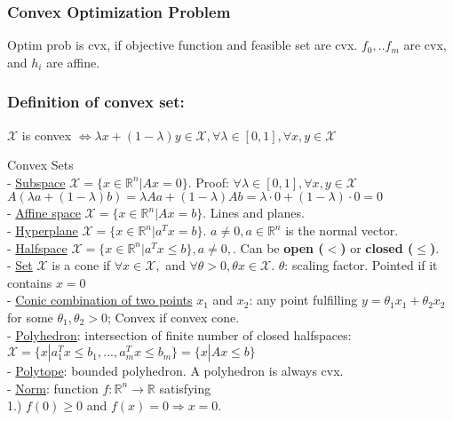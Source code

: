 \documentclass[10pt,parskip]{scrartcl}
\begin{document}
\begin{multicols*}{3}
\subsubsection{Convex Optimization Problem}
Optim prob is cvx, if objective function and feasible set are cvx. $f_0, ..f_m$ are cvx, and $h_i$ are affine.
 
\subsubsection{Definition of convex set:}
$\mathcal X$ is convex $\Leftrightarrow \lambda x + (1-\lambda) y \in \mathcal X, \forall \lambda \in [0,1], \forall x,y \in \mathcal X$


Convex Sets\\
- \underline{Subspace} $\mathcal X = \{ x \in \mathbb R^n | Ax = 0\}$. Proof: $ \forall \lambda \in [0,1], \forall x,y \in \mathcal X$ \\
 $ A(\lambda a + (1-\lambda) b) = \lambda A a + (1-\lambda)Ab = \lambda \cdot 0 + (1-\lambda) \cdot 0 = 0 $\\
- \underline{Affine space} $\mathcal X = \{ x \in \mathbb R^n | Ax = b\}$. Lines and planes.\\
- \underline{Hyperplane} $\mathcal X = \{ x \in \mathbb R^n | a^T x = b\}$. $ a \ne 0, a\in \mathbb R^n$ is the normal vector.\\
- \underline{Halfspace} $\mathcal X = \{ x \in \mathbb R^n | a^T x \leq b\}, a \ne 0,$. Can be \textbf{open ($<$)} or \textbf{closed ($\leq$)}.\\
- \underline{Set} $\mathcal X$ is a cone if $\forall x \in \mathcal X,$ and $\forall \theta > 0, \theta x \in \mathcal X$. $\theta$: scaling factor. Pointed if it contains $x=0$\\
- \underline{Conic combination of two points} $x_1$ and $x_2$: any point fulfilling $y = \theta_1 x_1 + \theta_2 x_2$\\
 for some $\theta_1, \theta_2 >0$; Convex if convex cone.\\
- \underline{Polyhedron}: intersection of finite number of closed halfspaces: $\mathcal X = \{x | a_1^T x \leq b_1,...,a_m^T x \leq b_m\} = \{x | A x \leq b\}$\\
- \underline{Polytope}: bounded polyhedron. A polyhedron is always cvx.\\
- \underline{Norm}: function $f:\mathbb R^n \rightarrow \mathbb R$ satisfying\\
 1.) $f(0) \geq 0$ and $f(x) = 0 \Rightarrow x = 0$.\\

\end{multicols*}
\end{document}
